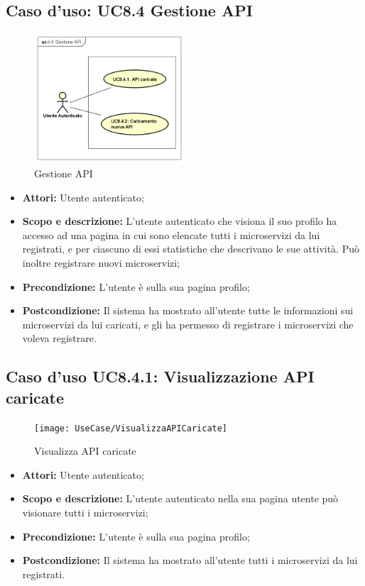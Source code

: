 \documentclass[12pt,a4paper,titlepage]{article}
\begin{document}
	\subsection{Caso d'uso: UC8.4 Gestione API}
	\label{UC8.4}
	\begin{figure}[H]
		\centering
		\includegraphics[width=0.5\textwidth]{UseCase/GestioneAPI}
		\caption{Gestione API}
	\end{figure}
	\begin{itemize}
		\item \textbf{Attori: }Utente autenticato;
		\item \textbf{Scopo e descrizione: }L'utente autenticato che visiona il suo profilo ha accesso ad una pagina in cui sono elencate tutti i microservizi da lui registrati, e per ciascuno di essi statistiche che descrivano le sue attività. Può inoltre registrare nuovi microservizi;
		\item \textbf{Precondizione: }L'utente è sulla sua pagina profilo;
		\item \textbf{Postcondizione: }Il sistema ha mostrato all'utente tutte le informazioni sui microservizi da lui caricati, e gli ha permesso di registrare i microservizi che voleva registrare.
	\end{itemize}
	\subsection{Caso d'uso UC8.4.1: Visualizzazione API caricate}
	\label{UC8.4.1}
	\begin{figure}[H]
		\centering
		\texttt{[image: UseCase/VisualizzaAPICaricate]}
		\caption{Visualizza API caricate}
	\end{figure}
	\begin{itemize}
		\item \textbf{Attori: }Utente autenticato;
		\item \textbf{Scopo e descrizione: }L'utente autenticato nella sua pagina utente può visionare tutti i microservizi;
		\item \textbf{Precondizione: }L'utente è sulla sua pagina profilo;
		\item \textbf{Postcondizione: }Il sistema ha mostrato all'utente tutti i microservizi da lui registrati.
	\end{itemize}
\end{document}
